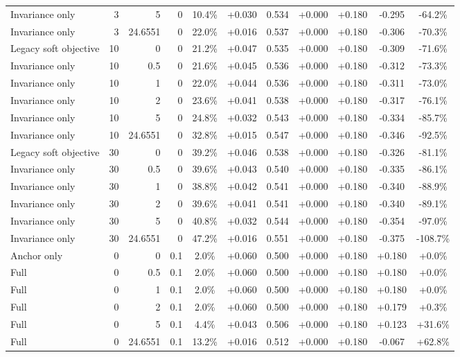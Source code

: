 \begin{table}[htbp]
\begin{tabular}{lrrrccccccc}
Invariance only & 3 & 5 & 0 & 10.4\% & +0.030 & 0.534 & +0.000 & +0.180 & -0.295 & -64.2\% \\
Invariance only & 3 & 24.6551 & 0 & 22.0\% & +0.016 & 0.537 & +0.000 & +0.180 & -0.306 & -70.3\% \\
Legacy soft objective & 10 & 0 & 0 & 21.2\% & +0.047 & 0.535 & +0.000 & +0.180 & -0.309 & -71.6\% \\
Invariance only & 10 & 0.5 & 0 & 21.6\% & +0.045 & 0.536 & +0.000 & +0.180 & -0.312 & -73.3\% \\
Invariance only & 10 & 1 & 0 & 22.0\% & +0.044 & 0.536 & +0.000 & +0.180 & -0.311 & -73.0\% \\
Invariance only & 10 & 2 & 0 & 23.6\% & +0.041 & 0.538 & +0.000 & +0.180 & -0.317 & -76.1\% \\
Invariance only & 10 & 5 & 0 & 24.8\% & +0.032 & 0.543 & +0.000 & +0.180 & -0.334 & -85.7\% \\
Invariance only & 10 & 24.6551 & 0 & 32.8\% & +0.015 & 0.547 & +0.000 & +0.180 & -0.346 & -92.5\% \\
Legacy soft objective & 30 & 0 & 0 & 39.2\% & +0.046 & 0.538 & +0.000 & +0.180 & -0.326 & -81.1\% \\
Invariance only & 30 & 0.5 & 0 & 39.6\% & +0.043 & 0.540 & +0.000 & +0.180 & -0.335 & -86.1\% \\
Invariance only & 30 & 1 & 0 & 38.8\% & +0.042 & 0.541 & +0.000 & +0.180 & -0.340 & -88.9\% \\
Invariance only & 30 & 2 & 0 & 39.6\% & +0.041 & 0.541 & +0.000 & +0.180 & -0.340 & -89.1\% \\
Invariance only & 30 & 5 & 0 & 40.8\% & +0.032 & 0.544 & +0.000 & +0.180 & -0.354 & -97.0\% \\
Invariance only & 30 & 24.6551 & 0 & 47.2\% & +0.016 & 0.551 & +0.000 & +0.180 & -0.375 & -108.7\% \\
Anchor only & 0 & 0 & 0.1 & 2.0\% & +0.060 & 0.500 & +0.000 & +0.180 & +0.180 & +0.0\% \\
Full & 0 & 0.5 & 0.1 & 2.0\% & +0.060 & 0.500 & +0.000 & +0.180 & +0.180 & +0.0\% \\
Full & 0 & 1 & 0.1 & 2.0\% & +0.060 & 0.500 & +0.000 & +0.180 & +0.180 & +0.0\% \\
Full & 0 & 2 & 0.1 & 2.0\% & +0.060 & 0.500 & +0.000 & +0.180 & +0.179 & +0.3\% \\
Full & 0 & 5 & 0.1 & 4.4\% & +0.043 & 0.506 & +0.000 & +0.180 & +0.123 & +31.6\% \\
Full & 0 & 24.6551 & 0.1 & 13.2\% & +0.016 & 0.512 & +0.000 & +0.180 & -0.067 & +62.8\% \\

\end{tabular}
\end{table}

